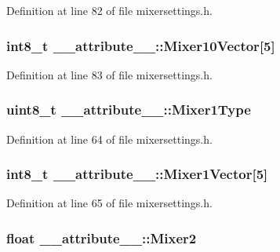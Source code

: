 \-Definition at line 82 of file mixersettings.\-h.

\hypertarget{struct____attribute_____a9157cb09ccb8487f68494002fe1eed89}{
\subsubsection[{\-Mixer10\-Vector}]{\setlength{\rightskip}{0pt plus 5cm}int8\-\_\-t {\bf \-\_\-\-\_\-attribute\-\_\-\-\_\-\-::\-Mixer10\-Vector}\mbox{[}5\mbox{]}}}\label{struct____attribute_____a9157cb09ccb8487f68494002fe1eed89}


\-Definition at line 83 of file mixersettings.\-h.

\hypertarget{struct____attribute_____aeaa8cea3f5b7375c8ae9d1093bf6f138}{
\subsubsection[{\-Mixer1\-Type}]{\setlength{\rightskip}{0pt plus 5cm}uint8\-\_\-t {\bf \-\_\-\-\_\-attribute\-\_\-\-\_\-\-::\-Mixer1\-Type}}}\label{struct____attribute_____aeaa8cea3f5b7375c8ae9d1093bf6f138}


\-Definition at line 64 of file mixersettings.\-h.

\hypertarget{struct____attribute_____a724b94fced06e6759a7b1a8feb47d7a5}{
\subsubsection[{\-Mixer1\-Vector}]{\setlength{\rightskip}{0pt plus 5cm}int8\-\_\-t {\bf \-\_\-\-\_\-attribute\-\_\-\-\_\-\-::\-Mixer1\-Vector}\mbox{[}5\mbox{]}}}\label{struct____attribute_____a724b94fced06e6759a7b1a8feb47d7a5}


\-Definition at line 65 of file mixersettings.\-h.

\hypertarget{struct____attribute_____a3f4506e5905f14d672d69fc402c2d379}{
\subsubsection[{\-Mixer2}]{\setlength{\rightskip}{0pt plus 5cm}float {\bf \-\_\-\-\_\-attribute\-\_\-\-\_\-\-::\-Mixer2}}}\label{struct____attribute_____a3f4506e5905f14d672d69fc402c2d379}


